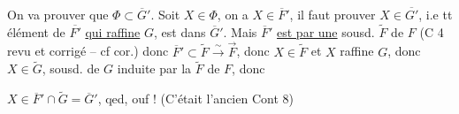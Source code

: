 On va prouver que $\Phi\subset\overline G'$. Soit $X\in\Phi$, on a $X\in\overline F'$,  il faut prouver $X\in\overline{G'}$, i.e   tt élément de $\overline{F'}$ \uline{qui raffine} $G$, est dans $\overline G'$. Mais $\overline F'$ \uline{est  par une} sousd. $\widetilde F$ de $F$ (C 4 revu et corrigé -- cf  cor.) donc $\overline F'\subset\widetilde F\xrightarrow{\sim}\overrightarrow F$, donc $X\in\widetilde F$ et $X$ raffine $G$, donc  $X\in\widetilde G$, sousd. de $G$ induite par la  $\widetilde F$ de $F$, donc


\deleted{$\Phi$} $X\in\overline F'\cap\widetilde G=\overline G'$, qed, ouf ! (C'était l'ancien Cont 8)


